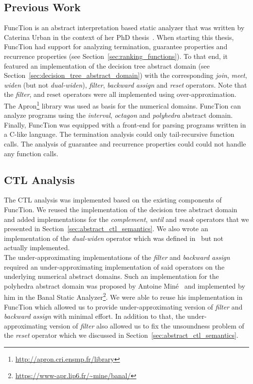 \documentclass[11pt,a4paper,titlepage]{article}
\theoremstyle{definition}
\begin{document}
\subsection{Previous Work}
FuncTion is an abstract interpretation based static analyzer that was written by Caterina Urban 
in the context of her PhD thesis~\cite{UrbanPhd}. 
When starting this thesis, FuncTion had support  for analyzing termination, guarantee properties and
recurrence properties (see Section~\ref{sec:ranking_functions}). To that end, it featured an implementation of 
the decision tree abstract domain (see Section~\ref{sec:decision_tree_abstract_domain}) with the corresponding \textit{join}, \textit{meet}, 
\textit{widen} (but not \textit{dual-widen}), \textit{filter}, \textit{backward assign} and \textit{reset} operators.
Note that the \textit{filter},  and $\text{reset}$ operators were all implemented using over-approximation. 
The Apron\footnote{\url{http://apron.cri.ensmp.fr/library}} library was used as basis for the numerical domains. 
FuncTion can analyze programs using the \textit{interval}, \textit{octagon} and \textit{polyhedra} abstract domain.
Finally, FuncTion was equipped with a front-end for parsing programs written in a C-like language. 
The termination analysis could only tail-recursive function calls. 
The analysis of guarantee and recurrence properties could could not handle any function calls.

\subsection{CTL Analysis}

The CTL analysis was implemented based on the existing components of FuncTion. We reused the implementation of the decision tree abstract domain
and added implementations for the \textit{complement}, \textit{until} and \textit{mask} operators that we presented in Section~\ref{sec:abstract_ctl_semantics}.
We also wrote an implementation of the \textit{dual-widen} operator which was defined in~\cite{UrbanPhd} but not actually implemented.\\

The under-approximating implementations of the \textit{filter} and \textit{backward assign} required an under-approximating implementation of said
operators on the underlying numerical abstract domains. Such an implementation for the polyhedra abstract domain was proposed by 
Antoine Miné~\cite{DBLP:journals/entcs/Mine12} and implemented by him in the Banal Static Analyzer\footnote{\url{https://www-apr.lip6.fr/~mine/banal/}}.
We were able to reuse his implementation in FuncTion which allowed us to provide under-approximating 
version of \textit{filter} and \textit{backward assign} with
minimal effort. In addition to that, the under-approximating version of \textit{filter} also allowed us to fix the unsoundness problem of the
\textit{reset} operator which we discussed in Section~\ref{sec:abstract_ctl_semantics}.\\
\end{document}
